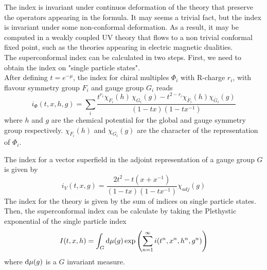 The index is invariant under continuos deformation of the theory that preserve the operators appearing in the formula.
It may seems a trivial fact, but the index is invariant under some non-conformal deformation.
As a result, it may be computed in a weakly coupled UV theory that flows to a non trivial conformal fixed point, such as the theories appearing in electric magnetic dualities. \\
The superconformal index can be calculated in two steps.
First, we need to obtain the index on "single particle states".\\
After defining $t = e^{-\mu}$, the index for chiral multiples $\Phi_i$ with R-charge $r_i$, with flavour symmetry group $F_i$ and gauge group $G_i$ reads
\begin{equation}
i_{\Phi}(t,x,h,g) = \sum_{i} \frac{ t^{r_i} \chi_{F_i}(h) \, \chi_{G_i}(g) - t^{2-r_i} \chi_{\bar{F}_i}(h) \chi_{\bar{G}_i}(g)}{ (1-tx) (1- t x^{-1})}
\end{equation}
where $h$ and $g$ are the chemical potential for the global and gauge symmetry group respectively. $\chi_{F_i}(h)$ and $\chi_{G_i}(g)$ are the character of the representation of $\Phi_i$.

The index for a vector superfield in the adjoint representation of a gauge group $G$ is given by
\begin{equation}
i_{V} (t,x,g) = \frac{2 t^2 - t(x + x^{-1})}{(1-tx) (1 - tx^{-1})} \chi_{adj}(g)
\end{equation}
The index for the theory is given by the sum of indices on single particle states. 
Then, the superconformal index can be calculate by taking the Plethystic exponential \cite{Feng:2007ur} of the single particle index
\begin{equation}
  I(t,x,h) = \int_{G} \hbox{d} \mu(g) \exp{ \left(  \sum_{n=1}^{\infty}i(t^n,x^n,h^n,g^n) \right)}
  \end{equation}  
  where $\hbox{d} \mu(g)$ is a $G$ invariant measure.\\


